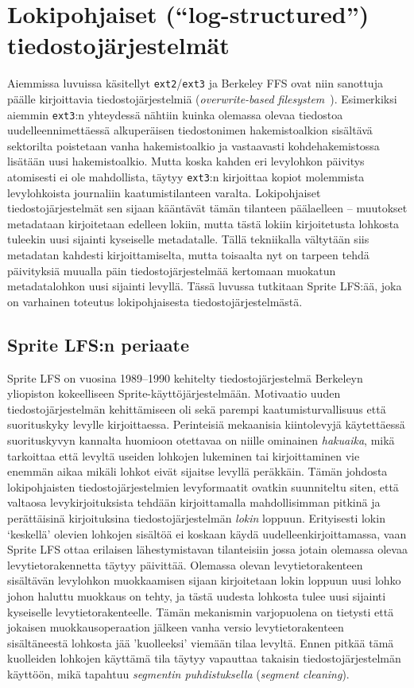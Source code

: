 \section{Lokipohjaiset (``log-structured'') tiedostojärjestelmät}
\label{ChapLogStructured}
Aiemmissa luvuissa käsitellyt \texttt{ext2}/\texttt{ext3} ja Berkeley FFS ovat niin sanottuja päälle kirjoittavia tiedostojärjestelmiä (\emph{overwrite-based filesystem}~\cite{Btrfs}).
Esimerkiksi aiemmin \texttt{ext3}:n yhteydessä nähtiin kuinka olemassa olevaa tiedostoa uudelleennimettäessä
alkuperäisen tiedostonimen hakemistoalkion sisältävä sektorilta poistetaan vanha hakemistoalkio
ja vastaavasti kohdehakemistossa lisätään uusi hakemistoalkio.
Mutta koska kahden eri levylohkon päivitys atomisesti ei ole mahdollista,
täytyy \texttt{ext3}:n kirjoittaa kopiot molemmista levylohkoista journaliin kaatumistilanteen varalta.
Lokipohjaiset tiedostojärjestelmät sen sijaan kääntävät tämän tilanteen päälaelleen -- muutokset metadataan kirjoitetaan edelleen lokiin,
mutta tästä lokiin kirjoitetusta lohkosta tuleekin uusi sijainti kyseiselle metadatalle.
Tällä tekniikalla vältytään siis metadatan kahdesti kirjoittamiselta,
mutta toisaalta nyt on tarpeen tehdä päivityksiä muualla päin tiedostojärjestelmää kertomaan muokatun metadatalohkon uusi sijainti levyllä.
Tässä luvussa tutkitaan Sprite LFS:ää, joka on varhainen toteutus lokipohjaisesta tiedostojärjestelmästä.

\subsection{Sprite LFS:n periaate}
Sprite LFS on vuosina 1989--1990 kehitelty tiedostojärjestelmä Berkeleyn yliopiston kokeelliseen Sprite-käyttöjärjestelmään.
Motivaatio uuden tiedostojärjestelmän kehittämiseen oli sekä parempi kaatumisturvallisuus että suorituskyky levylle kirjoittaessa.
Perinteisiä mekaanisia kiintolevyjä käytettäessä suorituskyvyn kannalta huomioon otettavaa on niille ominainen \emph{hakuaika},
mikä tarkoittaa että levyltä useiden lohkojen lukeminen tai kirjoittaminen vie enemmän aikaa mikäli lohkot eivät sijaitse levyllä peräkkäin.
Tämän johdosta lokipohjaisten tiedostojärjestelmien levyformaatit ovatkin suunniteltu siten,
että valtaosa levykirjoituksista tehdään kirjoittamalla mahdollisimman pitkinä ja perättäisinä kirjoituksina tiedostojärjestelmän \emph{lokin} loppuun.
Erityisesti lokin `keskellä' olevien lohkojen sisältöä ei koskaan käydä uudelleenkirjoittamassa,
vaan Sprite LFS ottaa erilaisen lähestymistavan tilanteisiin jossa jotain olemassa olevaa levytietorakennetta täytyy päivittää.
Olemassa olevan levytietorakenteen sisältävän levylohkon muokkaamisen sijaan kirjoitetaan lokin loppuun uusi lohko johon haluttu muokkaus on tehty,
ja tästä uudesta lohkosta tulee uusi sijainti kyseiselle levytietorakenteelle.
Tämän mekanismin varjopuolena on tietysti että jokaisen muokkausoperaation jälkeen vanha versio levytietorakenteen sisältäneestä lohkosta jää 'kuolleeksi' viemään tilaa levyltä.
Ennen pitkää tämä kuolleiden lohkojen käyttämä tila täytyy vapauttaa takaisin tiedostojärjestelmän käyttöön,
mikä tapahtuu \emph{segmentin puhdistuksella} (\emph{segment cleaning}).


